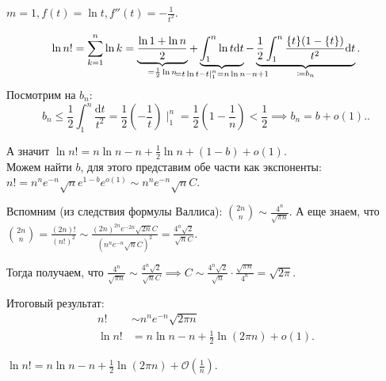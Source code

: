 \begin{example}
    $m = 1, f(t) = \ln t, f''(t) = -\frac{1}{t^2}$.

    \[
        \ln n! = \sum_{k=1}^n \ln k = \underbrace{\frac{\ln 1 + \ln n}{2}}_{= \frac{1}{2} \ln n} + \underbrace{\int_1^n \ln t \mathrm{d}t}_{\mathclap{=t\ln t-t\mid_1^n = n\ln n - n + 1}} - \underbrace{\frac{1}{2} \int_1^n \frac{\{t\}(1-\{t\})}{t^2} \mathrm{d}t}_{\coloneqq b_n}
    .\] 
    Посмотрим на $b_n$:  \[
        b_n \le \frac{1}{2} \int_1^n \frac{\mathrm{d}t}{t^2} = \frac{1}{2} (-\frac{1}{t}) \mid_1^n = \frac{1}{2} (1-\frac{1}{n}) < \frac{1}{2} \implies b_n = b + o(1).
    .\] 

    А значит $\ln n! = n \ln n - n + \frac{1}{2} \ln n + (1-b) + o(1)$. \\
    Можем найти $b$, для этого представим обе части как экспоненты: $n! = n^n e^{-n} \sqrt{n} e^{1-b} e^{o(1)} \sim n^n e^{-n} \sqrt{n} C$.

    Вспомним (из следствия формулы Валлиса): $\binom{2n}{n} \sim \frac{4^n}{\sqrt{\pi n}}$. А еще знаем, что $\binom{2n}{n} = \frac{(2n)!}{(n!)^2} \sim \frac{(2n)^{2n}e^{-2n}\sqrt{2n}C}{(n^n e^{-n}\sqrt{n}C)^2} = \frac{4^n \sqrt{2}}{\sqrt{n}C}$.

    Тогда получаем, что $\frac{4^n}{\sqrt{\pi n}} \sim \frac{4^n \sqrt{2}}{\sqrt{n}C} \implies C \sim \frac{4^n \sqrt{2}}{\sqrt{n}} \cdot \frac{\sqrt{\pi n}}{4^n} = \sqrt{2\pi}$.

    Итоговый результат: \begin{align*}
        n! &\sim n^n e^{-n} \sqrt{2\pi n}\\
        \ln n! &= n \ln n - n + \frac{1}{2} \ln (2\pi n) + o(1)
    .\end{align*}
\end{example}
\begin{remark}
    $\ln n! = n \ln n - n + \frac{1}{2} \ln(2 \pi n) + \mathcal{O}(\frac{1}{n})$.
\end{remark}
